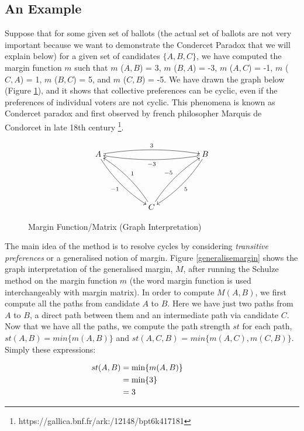 	\subsection{An Example}
	Suppose that for some given set of ballots (the actual set of ballots are not very important because we want to demonstrate the Condercet Paradox that we will explain below) for 
	a given set of candidates $\lbrace A, B, C \rbrace$, 
	we have computed 
	the margin function $m$ such that $m$ ($A, B$) = 3, $m$ ($B, A$) = -3, $m$ ($A, C$) = -1, 
	$m$ ($C, A$) = 1, $m$ ($B, C$) = 5, and $m$ ($C, B$) = -5. We have drawn the graph below (Figure \ref{marginfn}), and 
	it shows that collective preferences can be cyclic, even if the preferences of individual voters are not cyclic. This phenomena 
	is known as Condercet paradox and first observed by french philosopher Marquis de Condorcet in late 18th century \footnote{https://gallica.bnf.fr/ark:/12148/bpt6k417181}.
	   
	   

 \begin{figure}[h]
\[
\xymatrix@R=12ex@C=12ex{
A \ar@/^/[rr]^{3} \ar@/_/[dr]_{-1} & & B \ar@/^/[ll]^{-3}
\ar@/^/[dl]^5 \\
& C \ar@/_/[ul]_{1} \ar@/^/[ur]^{-5}
}\]

\caption{Margin Function/Matrix (Graph Interpretation)}\label{marginfn}
\end{figure}  


The main idea of the method is to resolve cycles by considering \emph{transitive preferences} or a generalised notion of margin. 
Figure \ref{generalisemargin} shows the graph interpretation of the generalised 
margin, $M$, after running the Schulze method on the margin function $m$ (the 
word margin function is used interchangeably with margin matrix).  In order to 
compute $M(A, B)$, we first compute all the paths from candidate $A$ to $B$. Here we have just two paths from $A$ to $B$, a direct path between them and 
an intermediate path via candidate $C$.  Now that we have all the paths, we compute the path strength $st$ for each path, $st(A, B) = min \lbrace m (A, B) \rbrace $ 
and $st (A, C, B)$ = $min \lbrace m (A, C), m (C, B) \rbrace$.  Simply these expressions:

\begin{align}
\hspace{-3cm} st (A, B)&=  \min \lbrace m (A, B) \rbrace  \nonumber \\
					  &= \min \lbrace 3 \rbrace \nonumber \\
                     &= 3 \nonumber
\end{align}


